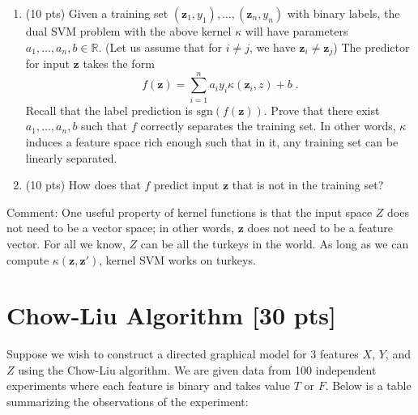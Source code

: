 \documentclass[a4paper]{article}
\theoremstyle{definition}
\def\R{\mathbb R}
\newenvironment{soln}{
    \leavevmode\color{blue}\ignorespaces
}{}
\begin{document}
\begin{enumerate}
\begin{soln}
\end{soln}
\item (10 pts) Given a training set $(\mathbf z_1, y_1), \ldots,(\mathbf z_n, y_n)$ with binary labels, the dual SVM problem with the above
kernel $\kappa$ will have parameters $a_1, \ldots, a_n,b \in \R$. (Let us assume that for $i \neq j$, we have
$\mathbf z_i \neq \mathbf z_j$) The predictor
for input $\mathbf z$ takes the form
\[
f(\mathbf z)=\sum_{i=1}^na_iy_i\kappa(\mathbf z_i,z) +b\;.
\]
Recall that the label prediction is $\mathrm{sgn}(f(\mathbf z))$. Prove that there exist $a_1, \ldots, a_n, b$ such that $f$ correctly separates
the training set. In other words, $\kappa$ induces a feature space rich enough such that in it, any training set can be linearly separated.
\item (10 pts) How does that $f$ predict input $\mathbf z$ that is not in the training set?
\end{enumerate}

Comment: One useful property of kernel functions is that the input space $Z$ does not need to be a vector space; in
other words, $\mathbf z$ does not need to be a feature vector. For all we know, $Z$ can be all the turkeys in the world. As long as we
can compute $\kappa(\mathbf z, \mathbf z')$, kernel SVM works on turkeys.

\section{Chow-Liu Algorithm [30 pts]}
Suppose we wish to construct a directed graphical model for 3 features $X$, $Y$, and $Z$ using the Chow-Liu algorithm. We are given data from 100 independent experiments where each feature is binary and takes value $T$ or $F$. Below is a table summarizing the observations of the experiment:
\end{document}
